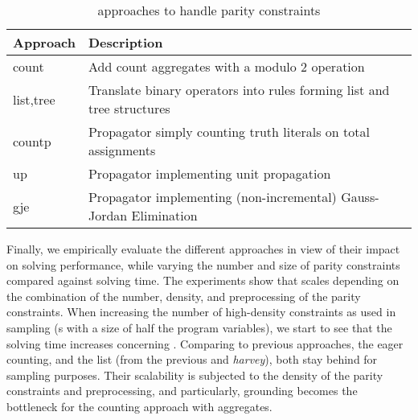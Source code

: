  \begin{table*}[t]
\caption{\xorro{} approaches to handle parity constraints}\label{table:xorro_approaches}
 	\begin{tabular}{ l|l }
 		Approach  & Description  \\
 		\hline\hline
 		count     & Add count aggregates with a modulo 2 operation  \\  
 		list,tree & Translate binary \XOR{} operators into rules forming list and tree structures \\
 		countp    & Propagator simply counting truth literals on total assignments\\
 		up        & Propagator implementing unit propagation\\
 		gje       & Propagator implementing (non-incremental) Gauss-Jordan Elimination
 		
 	\end{tabular}
\end{table*}
 Finally, we empirically evaluate the different approaches in view of their impact on solving performance,
 while varying the number and size of parity constraints compared against \clingo{} solving time.
 The experiments show that \xorro{} scales depending on the combination of the number, density, and preprocessing of the parity constraints.
 When increasing the number of high-density constraints as used in sampling (\XOR{}s with a size of half the program variables), we start to see that the solving time increases concerning \clingo.
 Comparing to previous approaches, the eager counting, and the list (from the previous \xorro{} and \emph{harvey}), both stay behind for sampling purposes. Their scalability is subjected to the density of the parity constraints and preprocessing, and particularly, grounding becomes the bottleneck for the counting approach with aggregates.